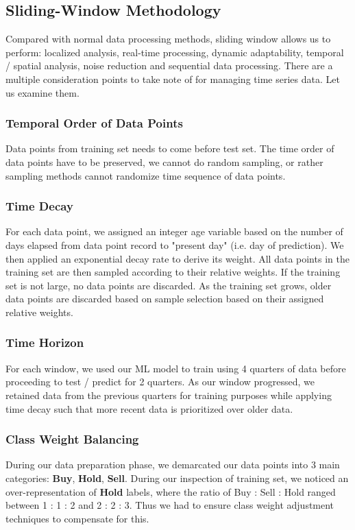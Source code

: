\documentclass{article}
\begin{document}
\subsection{Sliding-Window Methodology}
Compared with normal data processing methods, sliding window allows us to perform: localized analysis, real-time processing, dynamic adaptability, temporal / spatial analysis, noise reduction and sequential data processing.
\newline
\newline
There are a multiple consideration points to take note of for managing time series data. Let us examine them.

\subsubsection{Temporal Order of Data Points}
 Data points from training set needs to come before test set. The time order of data points have to be preserved, we cannot do random sampling, or rather sampling methods cannot randomize time sequence of data points.
\subsubsection{Time Decay}
For each data point, we assigned an integer age variable based on the number of days elapsed from data point record to "present day" (i.e. day of prediction). We then applied an exponential decay rate to derive its weight. All data points in the training set are then sampled according to their relative weights. If the training set is not large, no data points are discarded. As the training set grows, older data points are discarded based on sample selection based on their assigned relative weights.

\subsubsection{Time Horizon}
For each window, we used our ML model to train using 4 quarters of data before proceeding to test / predict for 2 quarters. As our window progressed, we retained data from the previous quarters for training purposes while applying time decay such that more recent data is prioritized over older data.

\subsubsection{Class Weight Balancing}
During our data preparation phase, we demarcated our data points into 3 main categories: \textbf{Buy}, \textbf{Hold}, \textbf{Sell}. During our inspection of training set, we noticed an over-representation of \textbf{Hold} labels, where the ratio of Buy : Sell : Hold ranged between 1 : 1 : 2 and 2 : 2 : 3. Thus we had to ensure class weight adjustment techniques to compensate for this.
\end{document}
